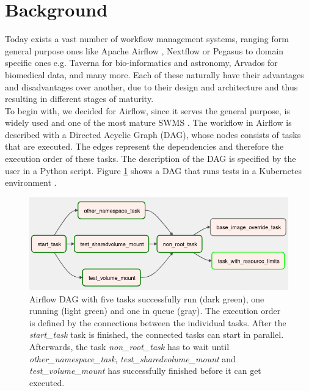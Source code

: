 \documentclass[a4paper,journal]{IEEEtran}
\begin{document}
	\section{Background}
	Today exists a vast number of workflow management systems, ranging form general purpose ones like Apache Airflow \cite{airflow}, Nextflow \cite{nextflow} or Pegasus \cite{pegasus} to domain specific ones e.g. Taverna \cite{taverna} for bio-informatics and astronomy, Arvados \cite{arvados} for biomedical data, and many more. Each of these naturally have their advantages and disadvantages over another, due to their design and architecture and thus resulting in different stages of maturity.\\
	To begin with, we decided for Airflow, since it serves the general purpose, is widely used and one of the most mature SWMS \cite{harenslak2021data}. The workflow in Airflow is described with a Directed Acyclic Graph (DAG), whose nodes consists of tasks that are executed. The edges represent the dependencies and therefore the execution order of these tasks. The description of the DAG is specified by the user in a Python script. Figure \ref{fig:aiflow:dag} shows a DAG that runs tests in a Kubernetes environment \cite{airflowDag}.
	\begin{figure}[h]
		\centering
		\includegraphics[width=0.7\linewidth]{images/airflow-dag.png}
		\caption{Airflow DAG with five tasks successfully run (dark green), one running (light green) and one in queue (gray). The execution order is defined by the connections between the individual tasks. After the \textit{start\_task} task is finished, the connected tasks can start in parallel. Afterwards, the task \textit{non\_root\_task} has to wait until \textit{other\_namespace\_task}, \textit{test\_sharedvolume\_mount} and \textit{test\_volume\_mount} has successfully finished before it can get executed.}
		\label{fig:aiflow:dag}
	\end{figure}
	
\end{document}
